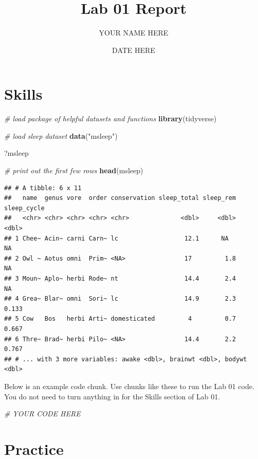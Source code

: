 \documentclass[]{article}
\title{Lab 01 Report}
\author{YOUR NAME HERE}
\date{DATE HERE}
\newenvironment{Shaded}{\begin{snugshade}}{\end{snugshade}}
\newcommand{\CommentTok}[1]{\textcolor[rgb]{0.56,0.35,0.01}{\textit{#1}}}
\newcommand{\KeywordTok}[1]{\textcolor[rgb]{0.13,0.29,0.53}{\textbf{#1}}}
\newcommand{\NormalTok}[1]{#1}
\newcommand{\StringTok}[1]{\textcolor[rgb]{0.31,0.60,0.02}{#1}}
\begin{document}
\maketitle

\hypertarget{skills}{%
\section{Skills}\label{skills}}

\begin{Shaded}
\begin{Highlighting}[]
\CommentTok{# load package of helpful datasets and functions}
\KeywordTok{library}\NormalTok{(tidyverse)}

\CommentTok{# load sleep dataset }
\KeywordTok{data}\NormalTok{(}\StringTok{"msleep"}\NormalTok{)}

\NormalTok{?msleep}

\CommentTok{# print out the first few rows}
\KeywordTok{head}\NormalTok{(msleep)}
\end{Highlighting}
\end{Shaded}

\begin{verbatim}
## # A tibble: 6 x 11
##   name  genus vore  order conservation sleep_total sleep_rem sleep_cycle
##   <chr> <chr> <chr> <chr> <chr>              <dbl>     <dbl>       <dbl>
## 1 Chee~ Acin~ carni Carn~ lc                  12.1      NA        NA    
## 2 Owl ~ Aotus omni  Prim~ <NA>                17         1.8      NA    
## 3 Moun~ Aplo~ herbi Rode~ nt                  14.4       2.4      NA    
## 4 Grea~ Blar~ omni  Sori~ lc                  14.9       2.3       0.133
## 5 Cow   Bos   herbi Arti~ domesticated         4         0.7       0.667
## 6 Thre~ Brad~ herbi Pilo~ <NA>                14.4       2.2       0.767
## # ... with 3 more variables: awake <dbl>, brainwt <dbl>, bodywt <dbl>
\end{verbatim}

Below is an example code chunk. Use chunks like these to run the Lab 01
code. You do not need to turn anything in for the Skills section of Lab
01.

\begin{Shaded}
\begin{Highlighting}[]
\CommentTok{# YOUR CODE HERE}
\end{Highlighting}
\end{Shaded}

\hypertarget{practice}{%
\section{Practice}\label{practice}}
\end{document}
